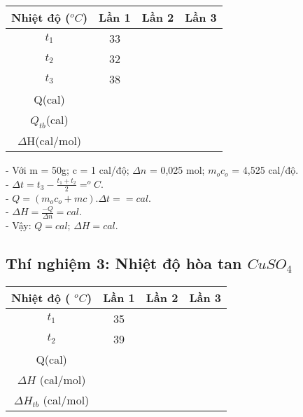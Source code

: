          \begin{center}
             \begin{tabular}{|c|c|c|c|}
                  \hline \textbf{Nhiệt độ ($ ^{o}C$)}&\textbf{Lần 1}&\textbf{Lần
                  2}&\textbf{Lần 3}\\
                  \hline \textbf{$t_{1}$}&33&&\\
                  \hline \textbf{$t_{2}$}&32&&\\
                  \hline \textbf{$t_{3}$}&38&&\\
                  \hline Q(cal)&&&\\
                  \hline $Q_{tb}$(cal)& \multicolumn{3}{c|}{}\\
                  \hline $\Delta$H(cal/mol)&\multicolumn{3}{c|}{}\\
                  \hline
             \end{tabular}
         \end{center} 
         - Với m = 50g; c = 1 cal/độ; $\Delta n$ = 0,025 mol; $m_{o}c_{o}$ = 4,525 cal/độ.\\
         - $\Delta t = t_{3} - \frac{t_{1}+t_{2}}{2} =  ^{o}C$.\\
         - $Q = (m_{o}c_{o} + mc).\Delta t=  = cal$.\\
         - $\Delta H = \frac{-Q}{\Delta n} =  cal$.\\
         - Vậy: $Q = cal$; $\Delta H = cal$.\\
         
      \newpage
      
      \subsection{Thí nghiệm 3: Nhiệt độ hòa tan $CuSO_{4}$}
      
         \begin{center}
             \begin{tabular}{|c|c|c|c|}
                  \hline Nhiệt độ ( $^{o}C$)&\textbf{Lần 1}&\textbf{Lần 2}&\textbf{Lần 3}\\
                  \hline $t_{1}$&35&&\\
                  \hline $t_{2}$&39&&\\
                  \hline Q(cal)&&&\\
                  \hline $\Delta H$ (cal/mol)&&&\\
                  \hline $\Delta H_{tb}$ (cal/mol)&\multicolumn{3}{c|}{}\\
                  \hline
             \end{tabular}
         \end{center}

